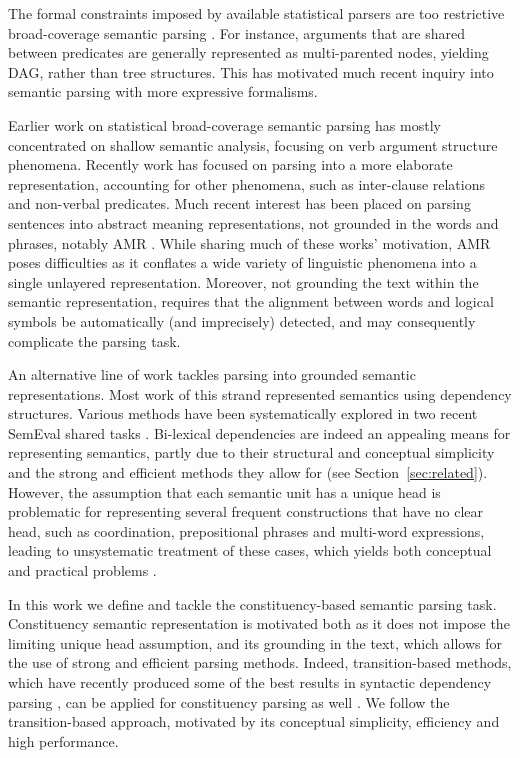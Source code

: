 \documentclass[11pt]{article}
\newcommand{\secref}[1]{Section~\ref{#1}}
\begin{document}
The formal constraints imposed by available statistical parsers are too restrictive
broad-coverage semantic parsing \cite{oepen2015semeval}.
For instance, arguments that are shared
between predicates are generally represented as multi-parented nodes,
yielding DAG, rather than tree structures. This has motivated much recent
inquiry into semantic parsing with more expressive formalisms.

Earlier work on statistical broad-coverage semantic parsing has mostly
concentrated on shallow semantic analysis, focusing on verb argument structure phenomena.
Recently work has focused on parsing into a more elaborate representation, accounting
for other phenomena, such as inter-clause relations and non-verbal predicates.
Much recent interest has been placed on parsing sentences into abstract meaning representations,
not grounded in the words and phrases, notably AMR \cite{banarescu2013abstract}.
While sharing much of these works' motivation, AMR poses difficulties as it conflates
a wide variety of linguistic phenomena into a single unlayered representation.
Moreover, not grounding the text within the semantic representation,
requires that the alignment between words and logical symbols be automatically
(and imprecisely) detected, and may consequently complicate the parsing task.

An alternative line of work tackles parsing into grounded semantic representations.
Most work of this strand represented semantics using dependency structures.
Various methods have been systematically explored
in two recent SemEval shared tasks \cite{oepen2014semeval,oepen2015semeval}.
Bi-lexical dependencies are indeed an appealing means for representing semantics, partly due to
their structural and conceptual simplicity and the strong and efficient
methods they allow for (see \secref{sec:related}).
However, the assumption that each semantic unit has a unique head is
problematic for representing several frequent constructions that have no clear
head, such as coordination, prepositional phrases and multi-word expressions,
leading to unsystematic treatment of these cases, which yields both conceptual
and practical problems \cite{schwartz2011neutralizing,Ivanova2012who,tsarfaty2012cross}.

In this work we define and tackle the constituency-based semantic parsing task.
Constituency semantic representation is motivated both as it does not
impose the limiting unique head assumption, and its grounding in the text,
which allows for the use of strong and efficient parsing methods.
Indeed, transition-based methods, which have recently produced some of the best
results in syntactic dependency parsing \cite{dyer2015transition,ballesteros2015improved},
can be applied
for constituency parsing as well \cite{sagae2005classifier,zhu2013fast,maier2015discontinuous}. 
We follow the transition-based approach, motivated by its conceptual simplicity,
efficiency and high performance.
\end{document}
